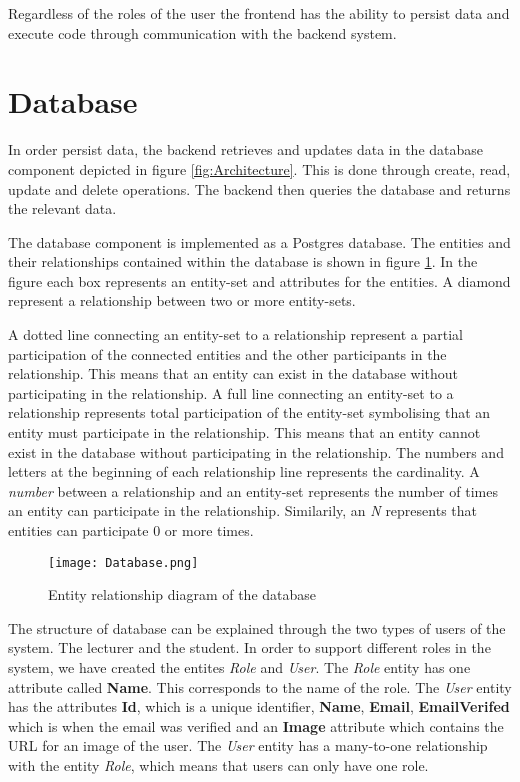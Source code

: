 Regardless of the roles of the user the frontend has the ability to persist data and execute code through communication with the backend system.

\section{Database}
In order persist data, the backend retrieves and updates data in the database component depicted in figure \ref{fig:Architecture}. This is done through create, read, update and delete operations. 
The backend then queries the database and returns the relevant data. 

The database component is implemented as a Postgres database. The entities and their relationships contained within the database is shown in figure \ref{fig:Database}. In the figure each box represents an entity-set and attributes for the entities. A diamond represent a relationship between two or more entity-sets.

A dotted line connecting an entity-set to a relationship represent a partial participation of the connected entities and the other participants in the relationship. This means that an entity can exist in the database without participating in the relationship.
A full line connecting an entity-set to a relationship represents total participation of the entity-set symbolising that an entity must participate in the relationship. 
This means that an entity cannot exist in the database without participating in the relationship.
The numbers and letters at the beginning of each relationship line represents the cardinality. A \textit{number} between a relationship and an entity-set represents the number of times an entity can participate in the relationship. Similarily, an \textit{N} represents that entities can participate $0$ or more times.

\begin{figure}[H]
	\texttt{[image: Database.png]}
	\centering
	\caption{Entity relationship diagram of the database}
	\label{fig:Database}
\end{figure}

The structure of database can be explained through the two types of users of the system. The lecturer and the student.
In order to support different roles in the system, we have created the entites \textit{Role} and \textit{User}. The \textit{Role} entity has one attribute called \textbf{Name}. This corresponds to the name of the role. The \textit{User} entity has the attributes \textbf{Id}, which is a unique identifier, \textbf{Name}, \textbf{Email}, \textbf{EmailVerifed} which is when the email was verified and an \textbf{Image} attribute which contains the URL for an image of the user. The \textit{User} entity has a many-to-one relationship with the entity \textit{Role}, which means that users can only have one role.

